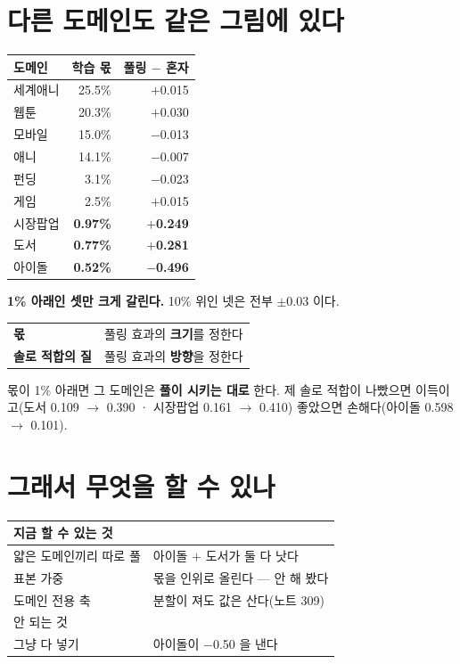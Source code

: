 \documentclass[10pt]{article}
\begin{document}
\section{다른 도메인도 같은 그림에 있다}

\begin{center}\footnotesize
\begin{tabular}{lrr}
\hline
도메인 & 학습 몫 & 풀링 $-$ 혼자 \\
\hline
세계애니 & 25.5\% & $+$0.015 \\
웹툰 & 20.3\% & $+$0.030 \\
모바일 & 15.0\% & $-$0.013 \\
애니 & 14.1\% & $-$0.007 \\
펀딩 & 3.1\% & $-$0.023 \\
게임 & 2.5\% & $+$0.015 \\
\hline
시장팝업 & \textbf{0.97\%} & \textbf{$+$0.249} \\
도서 & \textbf{0.77\%} & \textbf{$+$0.281} \\
아이돌 & \textbf{0.52\%} & \textbf{$-$0.496} \\
\hline
\end{tabular}
\end{center}

\textbf{1\% 아래인 셋만 크게 갈린다.} 10\% 위인 넷은 전부 $\pm$0.03 이다.

\begin{center}\small
\begin{tabular}{ll}
\hline
\textbf{몫} & 풀링 효과의 \textbf{크기}를 정한다 \\
\textbf{솔로 적합의 질} & 풀링 효과의 \textbf{방향}을 정한다 \\
\hline
\end{tabular}
\end{center}

몫이 1\% 아래면 그 도메인은 \textbf{풀이 시키는 대로} 한다. 제 솔로 적합이
나빴으면 이득이고(도서 0.109 $\to$ 0.390 · 시장팝업 0.161 $\to$ 0.410)
좋았으면 손해다(아이돌 0.598 $\to$ 0.101).

\section{그래서 무엇을 할 수 있나}

\begin{center}\footnotesize
\begin{tabular}{ll}
\hline
지금 할 수 있는 것 & \\
\hline
얇은 도메인끼리 따로 풀 & 아이돌 $+$ 도서가 둘 다 낫다 \\
표본 가중 & 몫을 인위로 올린다 --- 안 해 봤다 \\
도메인 전용 축 & 분할이 져도 값은 산다(노트 309) \\
\hline
안 되는 것 & \\
\hline
그냥 다 넣기 & 아이돌이 $-$0.50 을 낸다 \\
\hline
\end{tabular}
\end{center}
\end{document}

